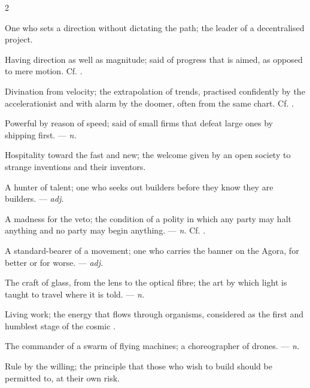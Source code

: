 \begin{multicols}{2}

 One who sets a direction without dictating the path; the leader of a decentralised project.

 Having direction as well as magnitude; said of progress that is aimed, as opposed to mere motion. Cf. .

 Divination from velocity; the extrapolation of trends, practised confidently by the accelerationist and with alarm by the doomer, often from the same chart. Cf. .

 Powerful by reason of speed; said of small firms that defeat large ones by shipping first. —  \textit{n.}

 Hospitality toward the fast and new; the welcome given by an open society to strange inventions and their inventors.

 A hunter of talent; one who seeks out builders before they know they are builders. —  \textit{adj.}

 A madness for the veto; the condition of a polity in which any party may halt anything and no party may begin anything. —  \textit{n.} Cf. .

 A standard-bearer of a movement; one who carries the banner on the Agora, for better or for worse. —  \textit{adj.}

 The craft of glass, from the lens to the optical fibre; the art by which light is taught to travel where it is told. —  \textit{n.}

 Living work; the energy that flows through organisms, considered as the first and humblest stage of the cosmic .

 The commander of a swarm of flying machines; a choreographer of drones. —  \textit{n.}

 Rule by the willing; the principle that those who wish to build should be permitted to, at their own risk.

\end{multicols}


